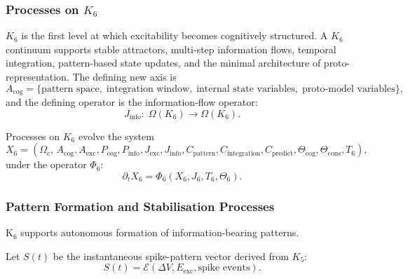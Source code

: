 

\subsubsection{Processes on \texorpdfstring{$K_6$}{K_6}}
\label{sec:processes-k6}

$K_6$ is the first level at which excitability becomes cognitively
structured. A $K_6$ continuum supports stable attractors,
multi-step information flows, temporal integration,
pattern-based state updates, and the minimal architecture of
proto-representation. The defining new axis is
\[
A_{\text{cog}} =
\{\text{pattern space},\;
\text{integration window},\;
\text{internal state variables},\;
\text{proto-model variables}\},
\]
and the defining operator is the information-flow operator:
\[
J_{\text{info}}:\; \Omega(K_6)\to\Omega(K_6).
\]

Processes on $K_6$ evolve the system
\[
X_6 =
(\Omega_c,\, A_{\text{cog}}, A_{\text{exc}},
P_{\text{cog}}, P_{\text{info}},
J_{\text{exc}}, J_{\text{info}},
C_{\text{pattern}}, C_{\text{integration}},
C_{\text{predict}},
\Theta_{\text{cog}}, \Theta_{\text{cons}},
T_6),
\]
under the operator $\Phi_6$:
\[
\partial_t X_6 = \Phi_6(X_6, J_6, T_6, \Theta_6).
\]

\subsubsection{Pattern Formation and Stabilisation Processes}

K$_6$ supports autonomous formation of information-bearing patterns.

Let $S(t)$ be the instantaneous spike-pattern vector derived from $K_5$:
\[
S(t)=\mathcal{E}(\Delta V, E_{\text{exc}},\text{spike\ events}).
\]

